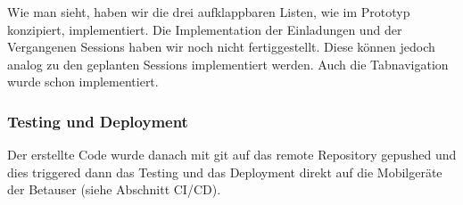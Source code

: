 Wie man sieht, haben wir die drei aufklappbaren Listen, wie im Prototyp konzipiert, implementiert. Die Implementation der Einladungen und der Vergangenen Sessions haben wir noch nicht fertiggestellt. Diese können jedoch analog zu den geplanten Sessions implementiert werden. Auch die Tabnavigation wurde schon implementiert.

\subsubsection{Testing und Deployment}
Der erstellte Code wurde danach mit git auf das remote Repository gepushed und dies triggered dann das Testing und das Deployment direkt auf die Mobilgeräte der Betauser (siehe Abschnitt CI/CD).
